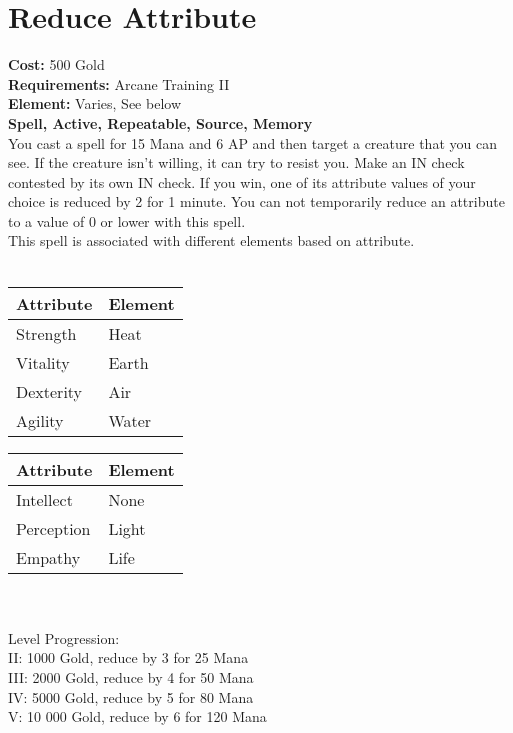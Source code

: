 \section{Reduce Attribute}
\textbf{Cost:} 500 Gold\\
\textbf{Requirements:} Arcane Training II\\
\textbf{Element:} Varies, See below\\
\textbf{Spell, Active, Repeatable, Source, Memory}\\
You cast a spell for 15 Mana and 6 AP and then target a creature that you can see. If the creature isn’t willing, it can try to resist you. Make an IN check contested by its own IN check. If you win, one of its attribute values of your choice is reduced by 2 for 1 minute. You can not temporarily reduce an attribute to a value of 0 or lower with this spell. \\
This spell is associated with different elements based on attribute.\\
\\
\begin{minipage}{0.5\textwidth}
	\begin{tabular}{l | l} 
		Attribute & Element\\ \hline
		Strength & Heat\\
		Vitality & Earth\\
		Dexterity & Air\\
		Agility & Water\\
	\end{tabular}
\end{minipage}
\begin{minipage}{0.5\textwidth}
	\begin{tabular}{l | l}
		Attribute & Element\\ \hline
		Intellect & None\\
		Perception & Light\\
		Empathy & Life\\
	\end{tabular}
\end{minipage}
\\
\\
Level Progression:\\
II: 1000 Gold, reduce by 3 for 25 Mana\\
III: 2000 Gold, reduce by 4 for 50 Mana\\
IV: 5000 Gold, reduce by 5 for 80 Mana\\
V: 10 000 Gold, reduce by 6 for 120 Mana\\
